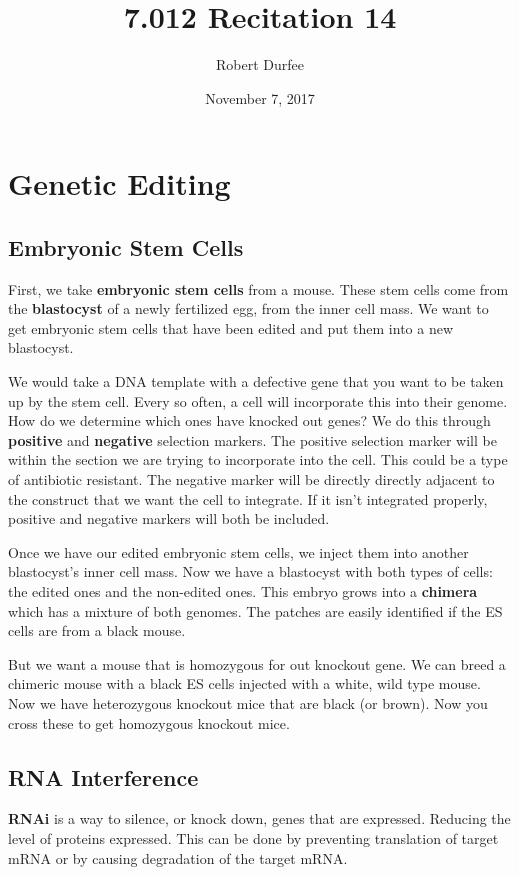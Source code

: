 \documentclass{article}
\title{7.012 Recitation 14}
\author{Robert Durfee}
\date{November 7, 2017}
\begin{document}
\maketitle

\section{Genetic Editing}

\subsection{Embryonic Stem Cells}

First, we take \textbf{embryonic stem cells} from a mouse. These stem cells come from the \textbf{blastocyst} of a newly fertilized egg, from the inner cell mass. We want to get embryonic stem cells that have been edited and put them into a new blastocyst.

We would take a DNA template with a defective gene that you want to be taken up by the stem cell. Every so often, a cell will incorporate this into their genome. How do we determine which ones have knocked out genes? We do this through \textbf{positive} and \textbf{negative} selection markers. The positive selection marker will be within the section we are trying to incorporate into the cell. This could be a type of antibiotic resistant. The negative marker will be directly directly adjacent to the construct that we want the cell to integrate. If it isn't integrated properly, positive and negative markers will both be included.

Once we have our edited embryonic stem cells, we inject them into another blastocyst's inner cell mass. Now we have a blastocyst with both types of cells: the edited ones and the non-edited ones. This embryo grows into a \textbf{chimera} which has a mixture of both genomes. The patches are easily identified if the ES cells are from a black mouse. 

But we want a mouse that is homozygous for out knockout gene. We can breed a chimeric mouse with a black ES cells injected with a white, wild type mouse. Now we have heterozygous knockout mice that are black (or brown). Now you cross these to get homozygous knockout mice.

\subsection{RNA Interference}

\textbf{RNAi} is a way to silence, or knock down, genes that are expressed. Reducing the level of proteins expressed. This can be done by preventing translation of target mRNA or by causing degradation of the target mRNA. 
\end{document}

